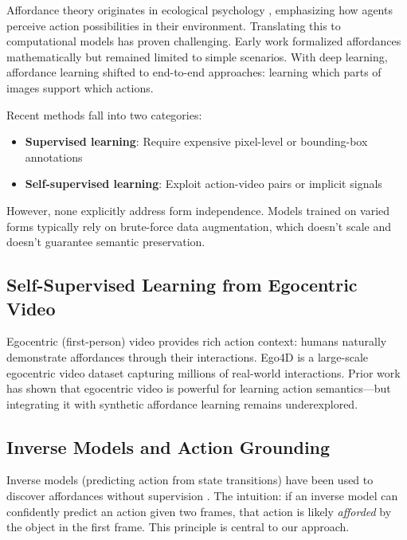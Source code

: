 \documentclass[11pt]{article}
\begin{document}
Affordance theory originates in ecological psychology \cite{gibson1977ecological}, emphasizing how agents perceive action possibilities in their environment. Translating this to computational models has proven challenging. Early work \cite{turvey1992affordances, bingham1995computational} formalized affordances mathematically but remained limited to simple scenarios. With deep learning, affordance learning shifted to end-to-end approaches: learning which parts of images support which actions.

Recent methods fall into two categories:
\begin{itemize}
    \item \textbf{Supervised learning}: Require expensive pixel-level or bounding-box annotations \cite{roy2023learning, lim2021affordance}
    \item \textbf{Self-supervised learning}: Exploit action-video pairs or implicit signals \cite{ha2018world, pathak2019learning}
\end{itemize}

However, none explicitly address form independence. Models trained on varied forms typically rely on brute-force data augmentation, which doesn't scale and doesn't guarantee semantic preservation.

\subsection{Self-Supervised Learning from Egocentric Video}

Egocentric (first-person) video provides rich action context: humans naturally demonstrate affordances through their interactions. Ego4D \cite{grauman2024ego4d} is a large-scale egocentric video dataset capturing millions of real-world interactions. Prior work \cite{wang2023learning, zellers2024understanding} has shown that egocentric video is powerful for learning action semantics—but integrating it with synthetic affordance learning remains underexplored.

\subsection{Inverse Models and Action Grounding}

Inverse models (predicting action from state transitions) have been used to discover affordances without supervision \cite{ha2018world, pathak2019learning}. The intuition: if an inverse model can confidently predict an action given two frames, that action is likely \textit{afforded} by the object in the first frame. This principle is central to our approach.
\end{document}
